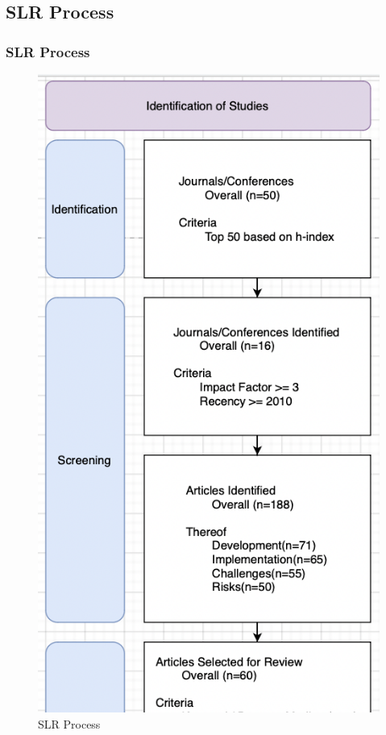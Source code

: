 \documentclass[
	11pt, %
]{beamer}
\begin{document}
\subsection{SLR Process}
\begin{frame}
	\frametitle{SLR Process}
	
	\begin{figure}
		\includegraphics[width=\textwidth,height=\textheight,keepaspectratio]{Images/slr.png}
		\caption{SLR Process}
	\end{figure}
\end{frame}
\end{document}
